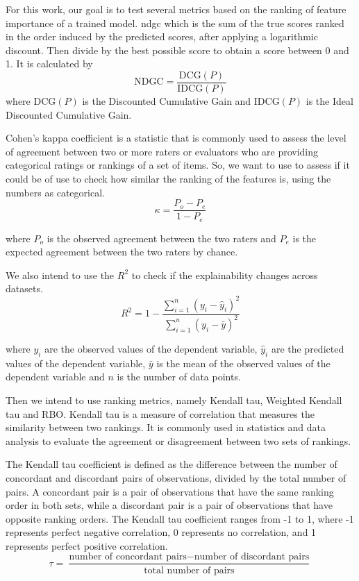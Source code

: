 
For this work, our goal is to test several metrics based on the ranking of feature importance of a trained model. \ac{ndgc} \cite{wangTheoreticalAnalysisNDCG} which is the sum of the true scores ranked in the order induced by the predicted scores, after applying a logarithmic discount. Then divide by the best possible score to obtain a score between 0 and 1. It is calculated by
\begin{equation}
\text{{NDGC}} = \frac{{\text{{DCG}}(P)}}{{\text{{IDCG}}(P)}}
\end{equation}
where $\text{{DCG}}(P)$ is the Discounted Cumulative Gain and $\text{{IDCG}}(P)$ is the Ideal Discounted Cumulative Gain. 

Cohen's kappa coefficient \cite{doi:10.1177/001316446002000104} is a statistic that is commonly used to assess the level of agreement between two or more raters or evaluators who are providing categorical ratings or rankings of a set of items. So, we want to use to assess if it could be of use to check how similar the ranking of the features is, using the numbers as categorical.
\begin{equation}
\kappa = \frac{{P_o - P_e}}{{1 - P_e}}
\end{equation}

where \(P_o\) is the observed agreement between the two raters and \(P_e\) is the expected agreement between the two raters by chance.

We also intend to use the $R^2$ to check if the explainability changes across datasets.
\begin{equation}
R^2 = 1 - \frac{{\sum_{i=1}^n (y_i - \hat{y}_i)^2}}{{\sum_{i=1}^n (y_i - \bar{y})^2}}
\end{equation}


where \(y_i\) are the observed values of the dependent variable, \(\hat{y}_i\) are the predicted values of the dependent variable, \(\bar{y}\) is the mean of the observed values of the dependent variable and \(n\) is the number of data points.

Then we intend to use ranking metrics, namely Kendall tau, Weighted Kendall tau and RBO.
Kendall tau is a measure of correlation that measures the similarity between two rankings. It is commonly used in statistics and data analysis to evaluate the agreement or disagreement between two sets of rankings.

The Kendall tau coefficient \cite{kendallTreatmentTiesRanking1945} is defined as the difference between the number of concordant and discordant pairs of observations, divided by the total number of pairs. A concordant pair is a pair of observations that have the same ranking order in both sets, while a discordant pair is a pair of observations that have opposite ranking orders. The Kendall tau coefficient ranges from -1 to 1, where -1 represents perfect negative correlation, 0 represents no correlation, and 1 represents perfect positive correlation. 
\begin{equation}
\tau = \frac{{\text{{number of concordant pairs}} - \text{{number of discordant pairs}}}}{{\text{{total number of pairs}}}}
\end{equation}


